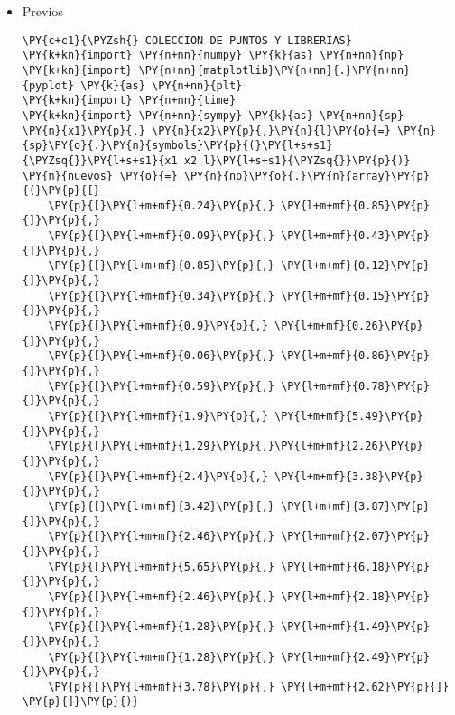 \begin{itemize}
\item  Previos 
 
    \begin{tcolorbox}[breakable, size=fbox, boxrule=1pt, pad at break*=1mm,colback=cellbackground, colframe=cellborder]
\begin{Verbatim}[commandchars=\\\{\}]
\PY{c+c1}{\PYZsh{} COLECCION DE PUNTOS Y LIBRERIAS}
\PY{k+kn}{import} \PY{n+nn}{numpy} \PY{k}{as} \PY{n+nn}{np}
\PY{k+kn}{import} \PY{n+nn}{matplotlib}\PY{n+nn}{.}\PY{n+nn}{pyplot} \PY{k}{as} \PY{n+nn}{plt}
\PY{k+kn}{import} \PY{n+nn}{time}
\PY{k+kn}{import} \PY{n+nn}{sympy} \PY{k}{as} \PY{n+nn}{sp}
\PY{n}{x1}\PY{p}{,} \PY{n}{x2}\PY{p}{,}\PY{n}{l}\PY{o}{=} \PY{n}{sp}\PY{o}{.}\PY{n}{symbols}\PY{p}{(}\PY{l+s+s1}{\PYZsq{}}\PY{l+s+s1}{x1 x2 l}\PY{l+s+s1}{\PYZsq{}}\PY{p}{)}
\PY{n}{nuevos} \PY{o}{=} \PY{n}{np}\PY{o}{.}\PY{n}{array}\PY{p}{(}\PY{p}{[}
    \PY{p}{[}\PY{l+m+mf}{0.24}\PY{p}{,} \PY{l+m+mf}{0.85}\PY{p}{]}\PY{p}{,}
    \PY{p}{[}\PY{l+m+mf}{0.09}\PY{p}{,} \PY{l+m+mf}{0.43}\PY{p}{]}\PY{p}{,}
    \PY{p}{[}\PY{l+m+mf}{0.85}\PY{p}{,} \PY{l+m+mf}{0.12}\PY{p}{]}\PY{p}{,}
    \PY{p}{[}\PY{l+m+mf}{0.34}\PY{p}{,} \PY{l+m+mf}{0.15}\PY{p}{]}\PY{p}{,}
    \PY{p}{[}\PY{l+m+mf}{0.9}\PY{p}{,} \PY{l+m+mf}{0.26}\PY{p}{]}\PY{p}{,}
    \PY{p}{[}\PY{l+m+mf}{0.06}\PY{p}{,} \PY{l+m+mf}{0.86}\PY{p}{]}\PY{p}{,}
    \PY{p}{[}\PY{l+m+mf}{0.59}\PY{p}{,} \PY{l+m+mf}{0.78}\PY{p}{]}\PY{p}{,}
    \PY{p}{[}\PY{l+m+mf}{1.9}\PY{p}{,} \PY{l+m+mf}{5.49}\PY{p}{]}\PY{p}{,}
    \PY{p}{[}\PY{l+m+mf}{1.29}\PY{p}{,}\PY{l+m+mf}{2.26}\PY{p}{]}\PY{p}{,}
    \PY{p}{[}\PY{l+m+mf}{2.4}\PY{p}{,} \PY{l+m+mf}{3.38}\PY{p}{]}\PY{p}{,}
    \PY{p}{[}\PY{l+m+mf}{3.42}\PY{p}{,} \PY{l+m+mf}{3.87}\PY{p}{]}\PY{p}{,}
    \PY{p}{[}\PY{l+m+mf}{2.46}\PY{p}{,} \PY{l+m+mf}{2.07}\PY{p}{]}\PY{p}{,}
    \PY{p}{[}\PY{l+m+mf}{5.65}\PY{p}{,} \PY{l+m+mf}{6.18}\PY{p}{]}\PY{p}{,}
    \PY{p}{[}\PY{l+m+mf}{2.46}\PY{p}{,} \PY{l+m+mf}{2.18}\PY{p}{]}\PY{p}{,}
    \PY{p}{[}\PY{l+m+mf}{1.28}\PY{p}{,} \PY{l+m+mf}{1.49}\PY{p}{]}\PY{p}{,}
    \PY{p}{[}\PY{l+m+mf}{1.28}\PY{p}{,} \PY{l+m+mf}{2.49}\PY{p}{]}\PY{p}{,}
    \PY{p}{[}\PY{l+m+mf}{3.78}\PY{p}{,} \PY{l+m+mf}{2.62}\PY{p}{]} 
\PY{p}{]}\PY{p}{)}
\end{Verbatim}
\end{tcolorbox}


\end{itemize}
